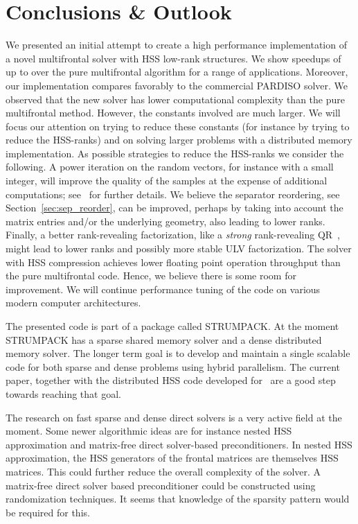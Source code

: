 \documentclass{article}
\begin{document}
\section{Conclusions \& Outlook}\label{sec:conclusions}
We presented an initial attempt to create a high performance
implementation of a novel multifrontal solver with HSS low-rank
structures. We show speedups of up to  over the pure
multifrontal algorithm for a range of applications. Moreover, our
implementation compares favorably to the commercial PARDISO solver. We
observed that the new solver has lower computational complexity than
the pure multifrontal method. However, the constants involved are much
larger. We will focus our attention on trying to reduce these
constants (for instance by trying to reduce the HSS-ranks) and on
solving larger problems with a distributed memory implementation. As
possible strategies to reduce the HSS-ranks we consider the
following. A power iteration on the random vectors, for instance  with  a small integer, will improve
the quality of the samples at the expense of additional computations;
see~\cite{halko2011finding} for further details. We believe the
separator reordering, see Section~\ref{sec:sep_reorder}, can be
improved, perhaps by taking into account the matrix entries and/or the
underlying geometry, also leading to lower ranks. Finally, a better
rank-revealing factorization, like a \emph{strong} rank-revealing
QR~\cite{gu1996efficient}, might lead to lower ranks and possibly more
stable ULV factorization. The solver with HSS compression achieves
lower floating point operation throughput than the pure multifrontal
code. Hence, we believe there is some room for improvement. We will
continue performance tuning of the code on various modern computer
architectures.

The presented code is part of a package called STRUMPACK. At the
moment STRUMPACK has a sparse shared memory solver and a dense
distributed memory solver. The longer term goal is to develop and
maintain a single scalable code for both sparse and dense problems
using hybrid parallelism. The current paper, together with the
distributed HSS code developed for~\cite{FHR} are a good step towards
reaching that goal.

The research on fast sparse and dense direct solvers is a very active
field at the moment. Some newer algorithmic ideas are for instance
nested HSS approximation and matrix-free direct solver-based
preconditioners. In nested HSS approximation, the HSS generators of
the frontal matrices are themselves HSS matrices. This could further
reduce the overall complexity of the solver. A matrix-free direct
solver based preconditioner could be constructed using randomization
techniques. It seems that knowledge of the sparsity pattern would be
required for this.
\end{document}
